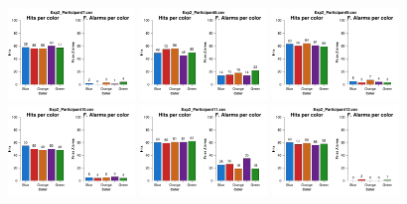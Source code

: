 \begin{figure}[th]
\includegraphics[width=0.30\textwidth]{Figures/Color_Exp2_P7} \includegraphics[width=0.30\textwidth]{Figures/Color_Exp2_P8} \includegraphics[width=0.30\textwidth]{Figures/Color_Exp2_P9}
\includegraphics[width=0.30\textwidth]{Figures/Color_Exp2_P10} \includegraphics[width=0.30\textwidth]{Figures/Color_Exp2_P11} \includegraphics[width=0.30\textwidth]{Figures/Color_Exp2_P12}

\end{figure}
